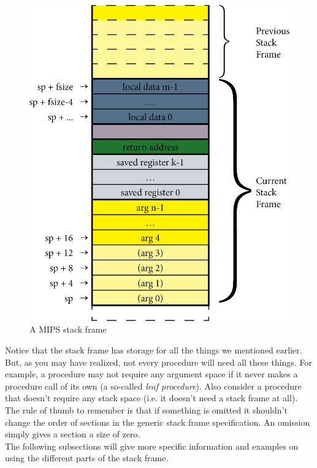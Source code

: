 \documentclass[12pt]{article}
\begin{document}
\begin{figure}
\centering
\includegraphics{stack-frame.png}
\caption{A MIPS stack frame}
\label{fig:stackframe}
\end{figure}

Notice that the stack frame has storage for all the things we mentioned
     earlier. But, as you may have realized, not every procedure will need all
     these things. For example, a procedure may not require any argument space
     if it never makes a procedure call of its own (a so-called \textit{leaf
     procedure}). Also consider a procedure that doesn't require any stack space
     (i.e. it doesn't need a stack frame at all). The rule of thumb to remember
     is that if something is omitted it shouldn't change the order of sections
     in the generic stack frame specification. An omission simply gives a
     section a size of zero.\\

The following subsections will give more specific information and examples on
     using the different parts of the stack frame.\\
\end{document}
